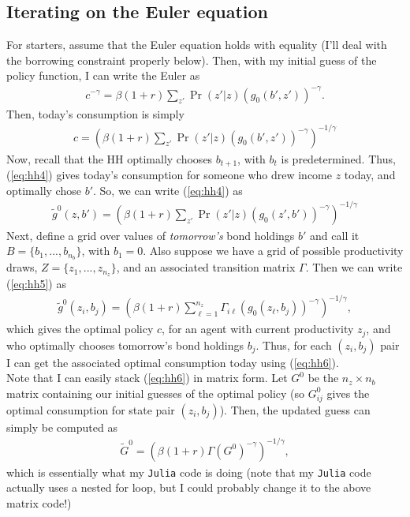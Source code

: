 \documentclass[12pt]{article}
\newcommand{\mtx}[1]{\ensuremath{\bm{\mathit{#1}}}}
\begin{document}
\subsection{Iterating on the Euler equation}
For starters, assume that the Euler equation holds with equality (I'll deal with the borrowing constraint properly below). Then, with my initial guess of the policy function, I can write the Euler as
\begin{align*}
c^{-\gamma} = \beta(1+r) \sum_{z'}\Pr(z'|z)(g_0(b',z'))^{-\gamma}.
\end{align*}
Then, today's consumption is simply
\begin{align}
c = \left( \beta(1+r) \sum_{z'}\Pr(z'|z)(g_0(b',z'))^{-\gamma}\right)^{-1/\gamma} \label{eq:hh4}
\end{align}
Now, recall that the HH optimally chooses $b_{t+1}$, with $b_t$ is predetermined. Thus, (\ref{eq:hh4}) gives today's consumption for someone who drew income $z$ today, and optimally chose $b'$. So, we can write (\ref{eq:hh4}) as
\begin{align}
\tilde g^0(z,b') = \left( \beta(1+r) \sum_{z'}\Pr(z'|z)(g_0(z',b'))^{-\gamma}\right)^{-1/\gamma} \label{eq:hh5}
\end{align}
Next, define a grid over values of \textit{tomorrow's} bond holdings $b'$ and call it $B = \{b_1, ...,b_{n_b}\}$, with $b_1 = 0$. Also suppose we have a grid of possible productivity draws, $Z=\{z_1, ..., z_{n_z}\}$, and an associated transition matrix $\Gamma$. Then we can write (\ref{eq:hh5}) as
\begin{align}
\tilde g^0(z_i,b_j) = \left( \beta(1+r) \sum_{\ell=1}^{n_z}\Gamma_{i\ell} (g_0(z_\ell,b_j))^{-\gamma}\right)^{-1/\gamma} \label{eq:hh6}, 
\end{align}
which gives the optimal policy $c$, for an agent with current productivity $z_j$, and who optimally chooses tomorrow's bond holdings $b_j$. Thus, for each $(z_i,b_j)$ pair I can get the associated optimal consumption today using (\ref{eq:hh6}).\\

Note that I can easily stack (\ref{eq:hh6}) in matrix form. Let $\mtx{G}^0$ be the $n_z \times n_b$ matrix containing our initial guesses of the optimal policy (so $\mtx{G}^0_{ij}$ gives the optimal consumption for state pair $(z_i,b_j)$). Then, the updated guess can simply be computed as
\begin{align*}
\widetilde{\mtx{G}}^0 = \left( \beta(1+r) \mtx{\Gamma} (\mtx{G}^0)^{-\gamma}\right)^{-1/\gamma},
\end{align*}
which is essentially what my \verb|Julia| code is doing (note that my \verb|Julia| code actually uses a nested for loop, but I could probably change it to the above matrix code!)\\
\end{document}
